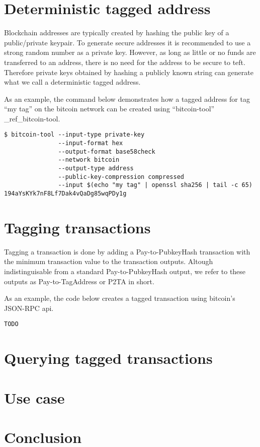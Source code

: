\documentclass[a4paper,10pt]{article}
\begin{document}
\section{Deterministic tagged address}
Blockchain addresses are typically created by hashing the public key of a public/private keypair.
To generate secure addresses it is recommended to use a strong random number as a private key.
However, as long as little or no funds are transferred to an address, there is no need for the address to be secure to teft.
Therefore private keys obtained by hashing a publicly known string can generate what we call a deterministic tagged address.

As an example, the command below demonstrates how a tagged address for tag ``my tag'' on the bitcoin network can be created using ``bitcoin-tool'' \_ref\_bitcoin-tool.
\begin{verbatim}
$ bitcoin-tool --input-type private-key
               --input-format hex
               --output-format base58check
               --network bitcoin
               --output-type address
               --public-key-compression compressed
               --input $(echo "my tag" | openssl sha256 | tail -c 65)
194aYsKYk7nF8Lf7Dak4vQaDg85wqPDy1g
\end{verbatim}

\section{Tagging transactions}
Tagging a transaction is done by adding a Pay-to-PubkeyHash transaction with the minimum transaction value to the transaction outputs.
Altough indistinguisable from a standard Pay-to-PubkeyHash output, we refer to these outputs as Pay-to-TagAddress or P2TA in short.

As an example, the code below creates a tagged transaction using bitcoin's JSON-RPC api.
\begin{verbatim}
TODO
\end{verbatim}


\section{Querying tagged transactions}

\section{Use case}

\section{Conclusion}
\end{document}
